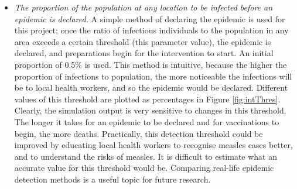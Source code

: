 \begin{itemize}
    \item \textit{The proportion of the population at any location to be infected before an epidemic is declared.} A simple method of declaring the epidemic is used for this project; once the ratio of infectious individuals to the population in any area exceeds a certain threshold (this parameter value), the epidemic is declared, and preparations begin for the intervention to start. An initial proportion of 0.5\% is used. This method is intuitive, because the higher the proportion of infections to population, the more noticeable the infections will be to local health workers, and so the epidemic would be declared. Different values of this threshold are plotted as percentages in Figure \ref{fig:intThres}. Clearly, the simulation output is very sensitive to changes in this threshold. The longer it takes for an epidemic to be declared and for vaccinations to begin, the more deaths. Practically, this detection threshold could be improved by educating local health workers to recognise measles cases better, and to understand the risks of measles. It is difficult to estimate what an accurate value for this threshold would be. Comparing real-life epidemic detection methods is a useful topic for future research.
    

\end{itemize}
